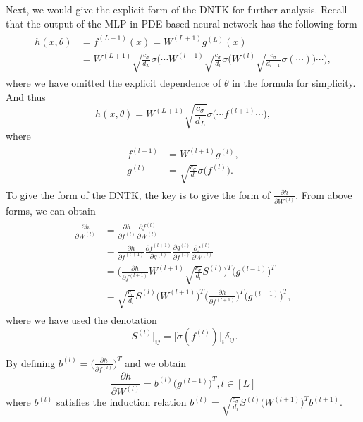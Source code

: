 \documentclass[hyperref]{article}
\newcommand{\pl}{\partial}
\numberwithin{equation}{section}
\theoremstyle{nonumberplain}
\begin{document}
	Next, we would give the explicit form of the DNTK for further analysis.
	Recall that the output of the MLP in PDE-based neural network has the following form 
	\begin{align}
		\begin{split}
			h(x,\theta) &= f^{(L+1)}(x) = W^{(L+1)}g^{(L)}(x)\\
			& = W^{(L+1)}\sqrt{\frac{c_\sigma}{d_L}}\sigma\biggl(\cdots W^{(l+1)}\sqrt{\frac{c_\sigma}{d_l}}\sigma\bigl(W^{(l)}\sqrt{\frac{c_\sigma}{d_{l-1}}}\sigma(\cdots) \bigr)\cdots\biggr),
		\end{split}
	\end{align}
	where we have omitted the explicit dependence of $\theta$ in the formula for simplicity. And thus
	\begin{equation}
		h(x,\theta)=W^{(L+1)}\sqrt{\frac{c_\sigma}{d_L}}\sigma\biggl(\cdots f^{(l+1)} \cdots\biggr),
	\end{equation}
	where 
	\begin{align}
		\begin{split}
			f^{(l+1)} &= W^{(l+1)}g^{(l)},\\
			g^{(l)} &= \sqrt{\frac{c_\sigma}{d_l}}\sigma\bigl(f^{(l)}\bigr).
		\end{split}
	\end{align}
	To give the form of the DNTK, the key is to give the form of $\frac{\pl h}{\pl W^{(l)}}$. From above forms, we can obtain
	\begin{align}
		\begin{split}
			\frac{\pl h}{\pl W^{(l)}} & = \frac{\pl h}{\pl f^{(l)}}\frac{\pl f^{(l)}}{\pl W^{(l)}}\\
			& = \frac{\pl h}{\pl f^{(l+1)}}\frac{\pl f^{(l+1)}}{\pl g^{(l)}}\frac{\pl g^{(l)}}{\pl f^{(l)}}\frac{\pl f^{(l)}}{\pl W^{(l)}}\\
			& = \biggl(\frac{\pl h}{\pl f^{(l+1)}}W^{(l+1)}\sqrt{\frac{c_\sigma}{d_l}}S^{(l)}\biggr)^T\bigl(g^{(l-1)}\bigr)^T\\
			& = \sqrt{\frac{c_\sigma}{d_l}}S^{(l)}\bigl(W^{(l+1)}\bigr)^T\bigl(\frac{\pl h}{\pl f^{(l+1)}}\bigr)^T\bigl(g^{(l-1)}\bigr)^T,
		\end{split}
	\end{align}
	where we have used the denotation
	\begin{equation}
		\bigl[S^{(l)}\bigr]_{ij} = \bigl[\dot{\sigma}(f^{(l)})\bigr]_i\delta_{ij}.
	\end{equation}
	
	By defining $b^{(l)} = \bigl(\frac{\pl h}{\pl f^{(l)}}\bigr)^T$ and we obtain
	\begin{equation}
		\frac{\pl h}{\pl W^{(l)}} = b^{(l)}\bigl(g^{(l-1)}\bigr)^T, l\in[L]
	\end{equation}
	where $b^{(l)}$ satisfies the induction relation
	$b^{(l)} = \sqrt{\frac{c_\sigma}{d_l}}S^{(l)}\bigl(W^{(l+1)}\bigr)^Tb^{(l+1)}$.
	
\end{document}
